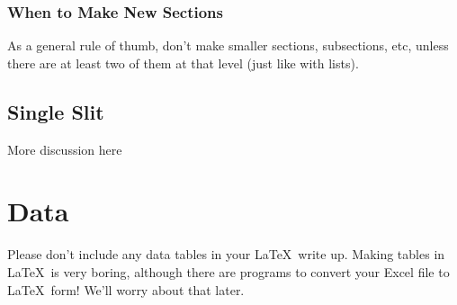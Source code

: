 \documentclass{llncs}
\begin{document}
       
       \subsubsection{When to Make New Sections}
        	As a general rule of thumb, don't make smaller sections, subsections, etc, unless there are at least two of them at that level (just like with lists).
	
    \subsection{Single Slit}
		More discussion here
        
\section{Data}
	Please don't include any data tables in your \LaTeX\, write up.  Making tables in \LaTeX\, is very boring, although there are programs to convert your Excel file to \LaTeX\, form!  We'll worry about that later.
\end{document}
